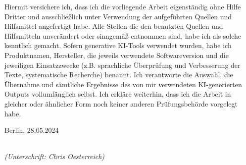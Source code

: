 \thispagestyle{empty}

\begin{large}

\vspace*{6cm}

\noindent
Hiermit versichere ich, dass ich die vorliegende Arbeit eigenständig ohne Hilfe Dritter und ausschließlich unter
Verwendung der aufgeführten Quellen und Hilfsmittel angefertigt habe. Alle Stellen die den benutzten Quellen
und Hilfsmitteln unverändert oder sinngemäß entnommen sind, habe ich als solche kenntlich gemacht.
Sofern generative KI-Tools verwendet wurden, habe ich Produktnamen, Hersteller, die jeweils verwendete
Softwareversion und die jeweiligen Einsatzzwecke (z.B. sprachliche Überprüfung und Verbesserung der Texte,
systematische Recherche) benannt. Ich verantworte die Auswahl, die Übernahme und sämtliche Ergebnisse
des von mir verwendeten KI-generierten Outputs vollumfänglich selbst. 
Ich erkläre weiterhin, dass ich die Arbeit in gleicher oder ähnlicher Form noch keiner anderen Prüfungsbehörde vorgelegt habe.
\vspace{2cm}

\noindent
Berlin, 28.05.2024

\vspace{3cm}

\hspace*{7cm}%
\dotfill\\
\hspace*{8.5cm}%
\textit{(Unterschrift: Chris Oesterreich)}

\end{large}
